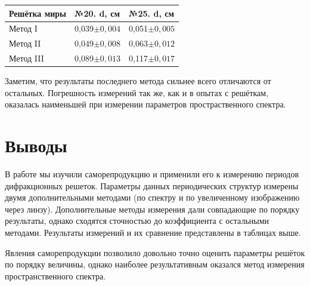 \begin{table}[!h]
    \centering
    \begin{tabular}{|l|l|l|}
    \hline
        Решётка миры & №20. d, см & №25. d, см \\ \hline
        Метод I & 0,039$\pm0,004$ & 0,051$\pm0,005$ \\ \hline
        Метод II & 0,049$\pm0,008$ & 0,063$\pm0,012$ \\ \hline
        Метод III & 0,089$\pm0,013$ & 0,117$\pm0,017$ \\ \hline
    \end{tabular}
\end{table}

Заметим, что результаты последнего метода сильнее всего отличаются от остальных. Погрешность измерений так же, как и в опытах с решёткам, оказалась наименьшей при измерении параметров простраственного спектра. 

\section{Выводы}
В работе мы изучили саморепродукцию и применили его к измерению периодов дифракционных решеток. Параметры данных периодических структур измерены двумя дополнительными методами (по спектру и по увеличенному изображению через линзу). Дополнительные методы измерения дали совпадающие по порядку результаты, однако сходятся сточностью до коэффициента с остальными методами. Результаты измерений и их сравнение представлены в таблицах выше. 

Явления саморепродукции позволило довольно точно оценить параметры решёток по порядку величины, однако наиболее результативным оказался метод измерения пространственного спектра.